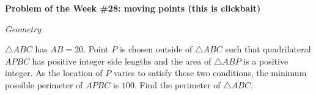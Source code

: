 \begin{potw}\vspace{5pt}
{\large\textbf{Problem of the Week \#28: moving points (this is clickbait)}}\vspace{5pt}

\textit{Geometry}\V

$\triangle{ABC}$ has $AB=20$. Point $P$ is chosen outside of $\triangle{ABC}$ such that quadrilateral $APBC$ has positive integer side lengths and the area of $\triangle{ABP}$ is a positive integer. As the location of $P$ varies to satisfy these two conditions, the minimum possible perimeter of $APBC$ is $100$. Find the perimeter of $\triangle{ABC}$. 
\end{potw}\V

